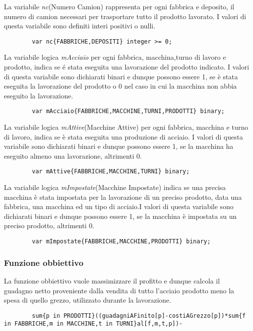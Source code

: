 \documentclass[12pt]{article} %
\begin{document}
		La variabile \textit{nc}(Numero Camion) rappresenta per ogni fabbrica e deposito, il numero di camion necessari per trasportare tutto il prodotto lavorato. I valori di questa variabile sono definiti interi positivi o nulli.
		\begin{lstlisting}
		var nc{FABBRICHE,DEPOSITI} integer >= 0;
		\end{lstlisting}

		La variabile logica \textit{mAcciaio} per ogni fabbrica, macchina,turno di lavoro e prodotto, indica se \'e stata eseguita una lavorazione del prodotto indicato. I valori di questa variabile sono dichiarati binari e dunque possono essere 1, se è stata eseguita la lavorazione del prodotto o 0 nel caso in cui la macchina non abbia eseguito la lavorazione.
		\begin{lstlisting}
		var mAcciaio{FABBRICHE,MACCHINE,TURNI,PRODOTTI} binary;
		\end{lstlisting}

		La variabile logica \textit{mAttive}(Macchine Attive) per ogni fabbrica, macchina e turno di lavoro, indica se è stata eseguita una produzione di acciaio. I valori di questa variabile sono dichiarati binari e dunque possono essere 1, se la macchina ha eseguito almeno una lavorazione, altrimenti 0.
		\begin{lstlisting}
		var mAttive{FABBRICHE,MACCHINE,TURNI} binary;
		\end{lstlisting}

		La variabile logica \textit{mImpostate}(Macchine Impostate) indica se una precisa macchina è stata impostata per la lavorazione di un preciso prodotto, data una fabbrica, una macchina ed un tipo di acciaio.I valori di questa variabile sono dichiarati binari e dunque possono essere 1, se la macchina è impostata su un preciso prodotto, altrimenti 0.
		\begin{lstlisting}
		var mImpostate{FABBRICHE,MACCHINE,PRODOTTI} binary;
		\end{lstlisting}

	\subsubsection{Funzione obbiettivo}
		La funzione obbiettivo vuole massimizzare il profitto e dunque calcola il guadagno netto proveniente dalla vendita di tutto l'acciaio prodotto meno la spesa di quello grezzo, utilizzato durante la lavorazione.
		\begin{lstlisting}
		sum{p in PRODOTTI}((guadagniAFinito[p]-costiAGrezzo[p])*sum{f in FABBRICHE,m in MACCHINE,t in TURNI}al[f,m,t,p])-
		\end{lstlisting}
\end{document}
